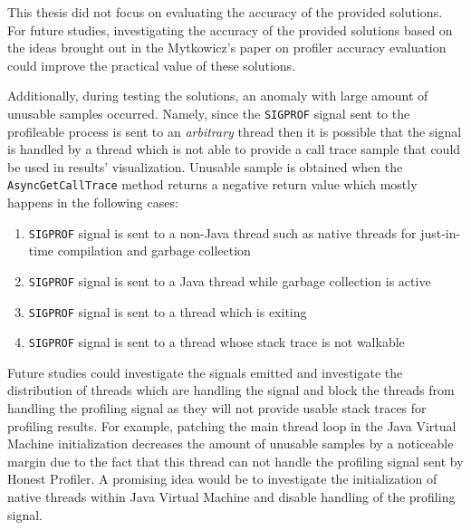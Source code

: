\documentclass[..thesis.tex]{subfiles}
\begin{document}
This thesis did not focus on evaluating the accuracy of the provided solutions. For future studies, investigating the accuracy of the provided solutions based on the ideas brought out in the Mytkowicz's paper on profiler accuracy evaluation \cite{mytkowicz_evaluating_2010} could improve the practical value of these solutions.


Additionally, during testing the solutions, an anomaly with large amount of unusable samples occurred. Namely, since the \texttt{SIGPROF} signal sent to the profileable process is sent to an \textit{arbitrary} thread then it is possible that the signal is handled by a thread which is not able to provide a call trace sample that could be used in results' visualization. Unusable sample is obtained when the \texttt{Async\-Get\-Call\-Trace} method returns a negative return value which mostly happens in the following cases:
\begin{enumerate}
	\item \texttt{SIGPROF} signal is sent to a non-Java thread such as native threads for just-in-time compilation and garbage collection
	\item \texttt{SIGPROF} signal is sent to a Java thread while garbage collection is active
	\item \texttt{SIGPROF} signal is sent to a thread which is exiting
	\item \texttt{SIGPROF} signal is sent to a thread whose stack trace is not walkable
\end{enumerate}

Future studies could investigate the signals emitted and investigate the distribution of threads which are handling the signal and block the threads from handling the profiling signal as they will not provide usable stack traces for profiling results.
For example, patching the main thread loop in the Java Virtual Machine initialization decreases the amount of unusable samples by a noticeable margin due to the fact that this thread can not handle the profiling signal sent by Honest Profiler. A promising idea would be to investigate the initialization of native threads within Java Virtual Machine and disable handling of the profiling signal.


\end{document}
